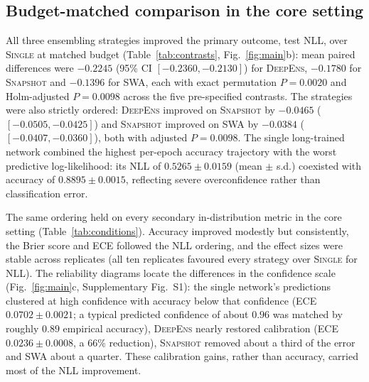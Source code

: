 \documentclass[11pt,a4paper]{article}
\newcommand{\deepens}{\textsc{DeepEns}}
\newcommand{\snapshot}{\textsc{Snapshot}}
\newcommand{\swa}{\textsc{SWA}}
\newcommand{\single}{\textsc{Single}}
\begin{document}
\subsection{Budget-matched comparison in the core setting}
\label{sec:results-main}

All three ensembling strategies improved the primary outcome, test NLL,
over \single{} at matched budget (Table~\ref{tab:contrasts},
Fig.~\ref{fig:main}b): mean paired differences were $-0.2245$ (95\% CI
$[-0.2360,-0.2130]$) for \deepens{}, $-0.1780$ for \snapshot{} and
$-0.1396$ for \swa{}, each with exact permutation $P=0.0020$ and
Holm-adjusted $P=0.0098$ across the five pre-specified contrasts. The
strategies were also strictly ordered: \deepens{} improved on \snapshot{}
by $-0.0465$ ($[-0.0505,-0.0425]$) and \snapshot{} improved on \swa{} by
$-0.0384$ ($[-0.0407,-0.0360]$), both with adjusted $P=0.0098$. The
single long-trained network combined the highest per-epoch accuracy
trajectory with the worst predictive log-likelihood: its NLL of $0.5265
\pm 0.0159$ (mean $\pm$ s.d.) coexisted with accuracy of $0.8895 \pm
0.0015$, reflecting severe overconfidence rather than classification
error.

The same ordering held on every secondary in-distribution metric in the
core setting
(Table~\ref{tab:conditions}). Accuracy improved modestly but consistently,
the Brier score and ECE followed the NLL ordering, and the effect sizes
were stable across replicates (all ten replicates favoured every strategy
over \single{} for NLL). The reliability diagrams locate the differences
in the confidence scale (Fig.~\ref{fig:main}c, Supplementary Fig.~S1): the
single network's predictions clustered at high confidence with accuracy
below that confidence (ECE $0.0702 \pm 0.0021$; a typical predicted
confidence of about $0.96$ was matched by roughly $0.89$ empirical
accuracy), \deepens{} nearly restored calibration (ECE $0.0236 \pm
0.0008$, a 66\% reduction), \snapshot{} removed about a third of the error
and \swa{} about a quarter. These calibration gains, rather than accuracy,
carried most of the NLL improvement.
\end{document}
